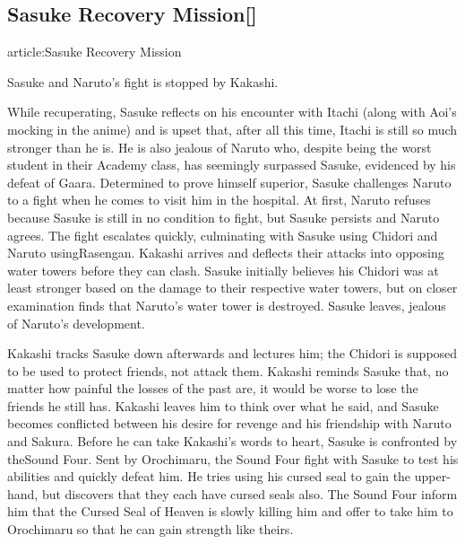 \documentclass[a4paper,12pt]{article}
\begin{document}
\subsection*{Sasuke Recovery Mission[]}\n\nMain article:Sasuke Recovery Mission\\ \par \vspace{0.5cm}

Sasuke and Naruto's fight is stopped by Kakashi.\\ \par \vspace{0.5cm}

While recuperating, Sasuke reflects on his encounter with Itachi (along with Aoi's mocking in the anime) and is upset that, after all this time, Itachi is still so much stronger than he is. He is also jealous of Naruto who, despite being the worst student in their Academy class, has seemingly surpassed Sasuke, evidenced by his defeat of Gaara. Determined to prove himself superior, Sasuke challenges Naruto to a fight when he comes to visit him in the hospital. At first, Naruto refuses because Sasuke is still in no condition to fight, but Sasuke persists and Naruto agrees. The fight escalates quickly, culminating with Sasuke using Chidori and Naruto usingRasengan. Kakashi arrives and deflects their attacks into opposing water towers before they can clash. Sasuke initially believes his Chidori was at least stronger based on the damage to their respective water towers, but on closer examination finds that Naruto's water tower is destroyed. Sasuke leaves, jealous of Naruto's development.\\ \par \vspace{0.5cm}

Kakashi tracks Sasuke down afterwards and lectures him; the Chidori is supposed to be used to protect friends, not attack them. Kakashi reminds Sasuke that, no matter how painful the losses of the past are, it would be worse to lose the friends he still has. Kakashi leaves him to think over what he said, and Sasuke becomes conflicted between his desire for revenge and his friendship with Naruto and Sakura. Before he can take Kakashi's words to heart, Sasuke is confronted by theSound Four. Sent by Orochimaru, the Sound Four fight with Sasuke to test his abilities and quickly defeat him. He tries using his cursed seal to gain the upper-hand, but discovers that they each have cursed seals also. The Sound Four inform him that the Cursed Seal of Heaven is slowly killing him and offer to take him to Orochimaru so that he can gain strength like theirs.\\ \par \vspace{0.5cm}
\end{document}
